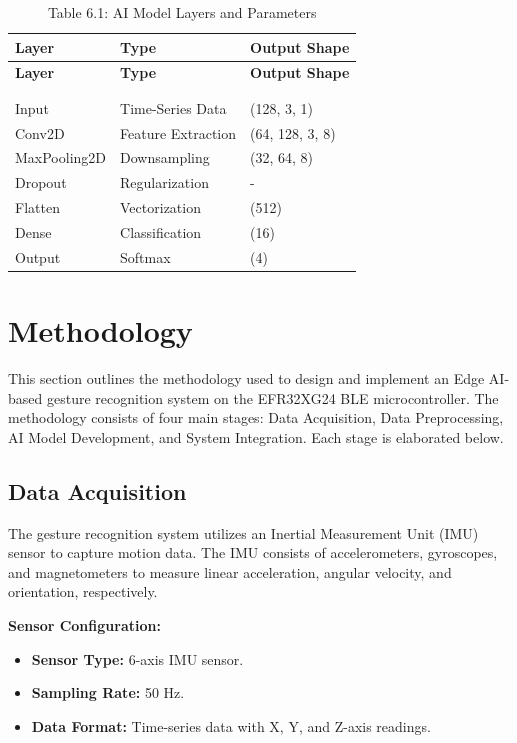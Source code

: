 \documentclass[
  9pt,
  letterpaper,
  abstract,
  titlepage]{scrbook}
\begin{document}
\begin{longtable}[]{@{}lll@{}}
\toprule\noalign{}
\textbf{Layer} & \textbf{Type} & \textbf{Output Shape} \\
\midrule\noalign{}
\endfirsthead
\toprule\noalign{}
\textbf{Layer} & \textbf{Type} & \textbf{Output Shape} \\
\midrule\noalign{}
\endhead
\bottomrule\noalign{}
\tabularnewline
\caption{Table 6.1: AI Model Layers and Parameters}\tabularnewline
\endlastfoot
Input & Time-Series Data & (128, 3, 1) \\
Conv2D & Feature Extraction & (64, 128, 3, 8) \\
MaxPooling2D & Downsampling & (32, 64, 8) \\
Dropout & Regularization & - \\
Flatten & Vectorization & (512) \\
Dense & Classification & (16) \\
Output & Softmax & (4) \\
\end{longtable}

\section{Methodology}\label{sec:methodology}

This section outlines the methodology used to design and implement an
Edge AI-based gesture recognition system on the EFR32XG24 BLE
microcontroller. The methodology consists of four main stages: Data
Acquisition, Data Preprocessing, AI Model Development, and System
Integration. Each stage is elaborated below.

\subsection{Data Acquisition}\label{data-acquisition}

The gesture recognition system utilizes an Inertial Measurement Unit
(IMU) sensor to capture motion data. The IMU consists of accelerometers,
gyroscopes, and magnetometers to measure linear acceleration, angular
velocity, and orientation, respectively.

\textbf{Sensor Configuration:}

\begin{itemize}
\item
  \textbf{Sensor Type:} 6-axis IMU sensor.
\item
  \textbf{Sampling Rate:} 50 Hz.
\item
  \textbf{Data Format:} Time-series data with X, Y, and Z-axis readings.
\end{itemize}
\end{document}
